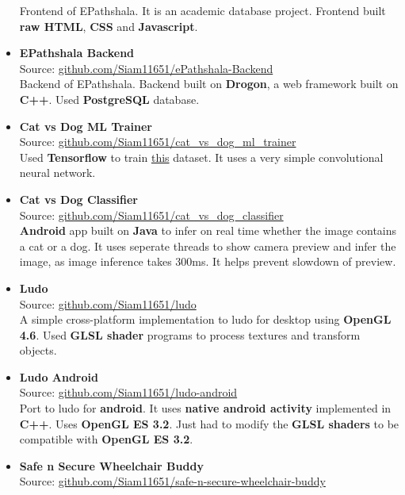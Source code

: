 \begin{itemize}
{    Frontend of EPathshala. It is an academic database project. Frontend built \textbf{raw HTML}, \textbf{CSS} and \textbf{Javascript}.
  }
  \item {
    \textbf{EPathshala Backend} \\
    Source: \href{https://github.com/Siam11651/ePathshala-Backend}{github.com/Siam11651/ePathshala-Backend} \\
    Backend of EPathshala. Backend built on \textbf{Drogon}, a web framework built on \textbf{C++}. Used \textbf{PostgreSQL} database.
  }
  \item {
      \textbf{Cat vs Dog ML Trainer} \\
      Source: \href{https://github.com/Siam11651/cat_vs_dog_ml_trainer}{github.com/Siam11651/cat\_vs\_dog\_ml\_trainer} \\
      Used \textbf{Tensorflow} to train \href{https://www.kaggle.com/competitions/dogs-vs-cats}{this} dataset. It uses a very simple convolutional neural network.
  }
  \item {
    \textbf{Cat vs Dog Classifier} \\
    Source: \href{https://github.com/Siam11651/cat_vs_dog_classifier}{github.com/Siam11651/cat\_vs\_dog\_classifier} \\
    \textbf{Android} app built on \textbf{Java} to infer on real time whether the image contains a cat or a dog. It uses seperate threads to show camera preview and infer the image, as image inference takes 300ms. It helps prevent slowdown of preview.
  }
  \item {
    \textbf{Ludo} \\
    Source: \href{https://github.com/Siam11651/ludo}{github.com/Siam11651/ludo} \\
    A simple cross-platform implementation to ludo for desktop using \textbf{OpenGL 4.6}. Used \textbf{GLSL shader} programs to process textures and transform objects.
  }
  \item {
    \textbf{Ludo Android} \\
    Source: \href{https://github.com/Siam11651/ludo-android}{github.com/Siam11651/ludo-android} \\
    Port to ludo for \textbf{android}. It uses \textbf{native android activity} implemented in \textbf{C++}. Uses \textbf{OpenGL ES 3.2}. Just had to modify the \textbf{GLSL shaders} to be compatible with \textbf{OpenGL ES 3.2}.
  }
  \item {
    \textbf{Safe n Secure Wheelchair Buddy} \\
    Source: \href{https://github.com/Siam11651/safe-n-secure-wheelchair-buddy}{github.com/Siam11651/safe-n-secure-wheelchair-buddy} \\
}
\end{itemize}

